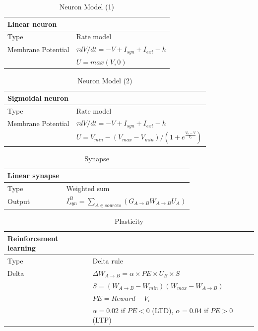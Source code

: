 \begin{table}[htbp]
\small \centering
\begin{tabular}{ll}
\bf Linear neuron &\\
\hline
Type               & Rate model\\
Membrane Potential & \(\tau dV/dt = -V + I_{syn} + I_{ext} - h\)\\
                   & \(U = max(V,0)\)\\
\hline
\end{tabular}
\caption{Neuron Model (1)}
\end{table}



\begin{table}[htbp]
\small \centering
\begin{tabular}{ll}
\bf Sigmoidal neuron &\\
\hline
Type & Rate model\\
Membrane Potential & \(\tau dV/dt = -V + I_{syn} + I_{ext} - h\)\\
&\(U = V_{min} - (V_{max}-V_{min}) / \left(1+e^{\frac{V_h - V}{V_c}}\right)\)\\
\hline
\end{tabular}
\caption{Neuron Model (2)}
\end{table}



\begin{table}[htbp]
\small \centering
\begin{tabular}{ll}
\bf Linear synapse &\\
\hline
Type & Weighted sum\\
Output &
\(I^{B}_{syn} = \sum_{A \in sources}(G_{A \rightarrow B} W_{A \rightarrow B} U_{A})\)\\
\hline
\end{tabular}
\caption{Synapse}
\end{table}



\begin{table}[htbp]
\small \centering
\begin{tabular}{ll}
\bf Reinforcement learning &\\
\hline
Type & Delta rule\\
Delta & \(\Delta W_{A \rightarrow B} = \alpha \times PE \times U_{B} \times S\)\\
      & \(S = (W_{A \rightarrow B}-W_{min})(W_{max} - W_{A \rightarrow B})\)\\
      & \(PE = Reward - V_{i}\)\\
      & \(\alpha = 0.02\) if \(PE < 0\) (LTD), \(\alpha = 0.04\) if \(PE > 0\) (LTP)\\
\hline
\end{tabular}
\caption{Plasticity}
\end{table}



